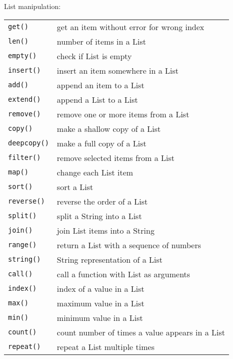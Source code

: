 List manipulation:
\label{list-functions}
\begin{center} \begin{tabular}{l l}
				\texttt{get()} & get an item without error for wrong index \\
				\texttt{len()} & number of items in a List \\
				\texttt{empty()} & check if List is empty \\
				\texttt{insert()} & insert an item somewhere in a List \\
				\texttt{add()} & append an item to a List \\
				\texttt{extend()} & append a List to a List \\
				\texttt{remove()} & remove one or more items from a List \\
				\texttt{copy()} & make a shallow copy of a List \\
				\texttt{deepcopy()} & make a full copy of a List \\
				\texttt{filter()} & remove selected items from a List \\
				\texttt{map()} & change each List item \\
				\texttt{sort()} & sort a List \\
				\texttt{reverse()} & reverse the order of a List \\
				\texttt{split()} & split a String into a List \\
				\texttt{join()} & join List items into a String \\
				\texttt{range()} & return a List with a sequence of numbers \\
				\texttt{string()} & String representation of a List \\
				\texttt{call()} & call a function with List as arguments \\
				\texttt{index()} & index of a value in a List \\
				\texttt{max()} & maximum value in a List \\
				\texttt{min()} & minimum value in a List \\
				\texttt{count()} & count number of times a value appears in a List \\
				\texttt{repeat()} & repeat a List multiple times \\
\end{tabular} \end{center}

